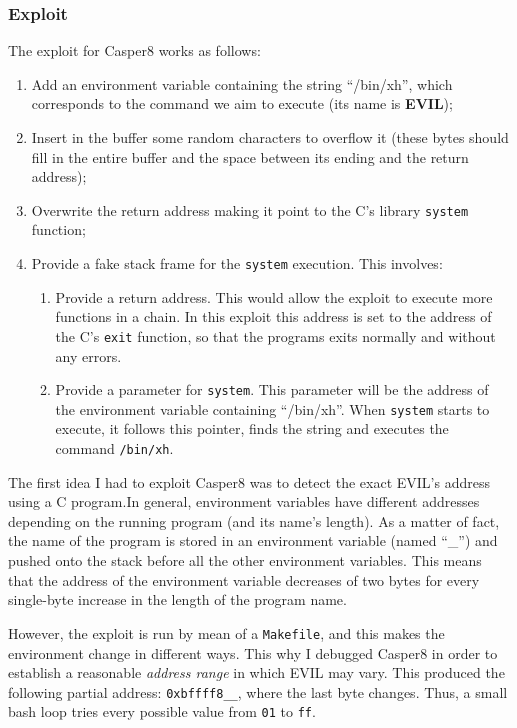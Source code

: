 \subsubsection{Exploit}
The exploit for Casper8 works as follows:
\begin{enumerate}
	\item Add an environment variable containing the string ``/bin/xh'', which corresponds to the command we aim to execute (its name is \textbf{EVIL});
	\item Insert in the buffer some random characters to overflow it (these bytes should fill in the entire buffer and the space between its ending and the return address);
	\item Overwrite the return address making it point to the C's library \texttt{system} function;
	\item Provide a fake stack frame for the \texttt{system} execution. This involves:
	\begin{enumerate}
		\item Provide a return address. This would allow the exploit to execute more functions in a chain. In this exploit this address is set to the address of the C's \texttt{exit} function, so that the programs exits normally and without any errors.
		\item Provide a parameter for \texttt{system}. This parameter will be the address of the environment variable containing ``/bin/xh''. When \texttt{system} starts to execute, it follows this pointer, finds the string and executes the command \texttt{/bin/xh}.
	\end{enumerate}
\end{enumerate}
The first idea I had to exploit Casper8 was to detect the exact EVIL's address using a C program.In general, environment variables have different addresses depending on the running program (and its name's length).  As a matter of fact, the name of the program is stored in an environment variable (named ``\_'') and pushed onto the stack before all the other environment variables. This means that the address of the environment variable decreases of two bytes for every single-byte increase in the length of the program name. 

However, the exploit is run by mean of a \texttt{Makefile}, and this makes the environment change in different ways. This why I debugged Casper8 in order to establish a reasonable \textit{address range} in which EVIL may vary. This produced the following partial address: \texttt{0xbffff8\_\_}, where the last byte changes. Thus, a small bash loop tries every possible value from \texttt{01} to \texttt{ff}. 

